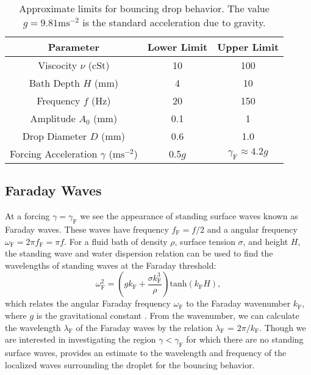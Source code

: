 	       \begin{table}[htdp] 
\caption[Basic Table 1]{Approximate limits for bouncing drop behavior. The value $g = 9.81\mathrm{ms}^{-2}$ is the standard acceleration due to gravity.} 
\begin{center} 
\begin{tabular}{c c c} 
\toprule 
  Parameter &  Lower Limit & Upper Limit \\
  \midrule
Viscocity $\nu$ (cSt) & 10 & 100 \\ 
Bath Depth $H$ (mm) & 4 & 10 \\
Frequency $f$ (Hz) & 20 & 150 \\
Amplitude $A_0$ (mm) & 0.1 & 1 \\
Drop Diameter $D$ (mm) & 0.6 & 1.0 \\
Forcing Acceleration $\gamma$ ($\mathrm{ms}^{-2}$) & 0.5$g$ & $\gamma_\mathrm{F} \approx 4.2g$ \\
\bottomrule 
\end{tabular}
\end{center}
\label{approxlimits} 
\end{table}	

\subsection{Faraday Waves}
	       At a forcing $\gamma = \gamma_\mathrm{F}$ we see the appearance of standing surface waves known as Faraday waves. These waves have frequency $f_\mathrm{F} = f/2$ and a angular frequency $\omega_\mathrm{F} = 2\pi f_\mathrm{F}=\pi f$. For a fluid bath of density $\rho$, surface tension $\sigma$, and height $H$, the standing wave and water dispersion relation can be used to find the wavelengths of standing waves at the Faraday threshold:
\begin{equation} \label{dispersion}
\omega_\mathrm{F}^2 = \left(gk_\mathrm{F}+\frac{\sigma k_\mathrm{F}^3}{\rho}\right)\mathrm{tanh}(k_\mathrm{F}H),
\end{equation} 
which relates the angular Faraday frequency $\omega_\mathrm{F}$ to the Faraday wavenumber $k_\mathrm{F}$, where $g$ is the gravitational constant . From the wavenumber, we can calculate the wavelength $\lambda_\mathrm{F}$ of the Faraday waves by the relation $\lambda_\mathrm{F}$ = $2\pi/k_\mathrm{F}$. Though we are interested in investigating the region $\gamma < \gamma_\mathrm{F}$ for which there are no standing surface waves,  provides an estimate to the wavelength and frequency of the localized waves surrounding the droplet for the bouncing behavior. 


